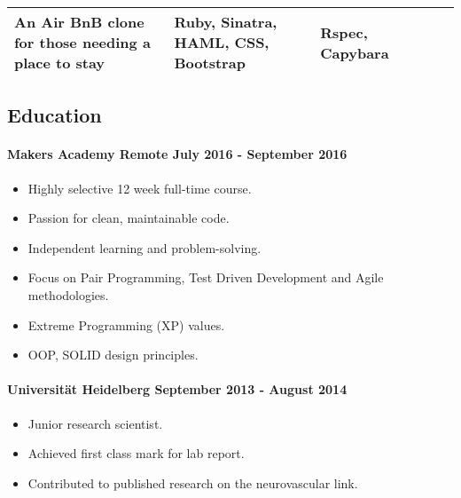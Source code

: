 \documentclass[]{article}
\providecommand{\tightlist}{%
  \setlength{\itemsep}{0pt}\setlength{\parskip}{0pt}}
\let\oldparagraph\paragraph
\renewcommand{\paragraph}[1]{\oldparagraph{#1}\mbox{}}
\begin{document}
\begin{longtable}[]{@{}llllll@{}}
\begin{minipage}[t]{0.05\columnwidth}
An Air BnB clone for those needing a place to stay\strut
\end{minipage} & \begin{minipage}[t]{0.05\columnwidth}\raggedright\strut
Ruby, Sinatra, HAML, CSS, Bootstrap\strut
\end{minipage} & \begin{minipage}[t]{0.05\columnwidth}\raggedright\strut
Rspec, Capybara\strut
\end{minipage} & \begin{minipage}[t]{0.05\columnwidth}\raggedright\strut
\strut
\end{minipage}\tabularnewline
\bottomrule
\end{longtable}

\subsection{Education}\label{education}

\paragraph{Makers Academy Remote \textbar{} July 2016 - September
2016}\label{makers-academy-remote-july-2016---september-2016}

\begin{itemize}
\tightlist
\item
  Highly selective 12 week full-time course.
\item
  Passion for clean, maintainable code.
\item
  Independent learning and problem-solving.
\item
  Focus on Pair Programming, Test Driven Development and Agile
  methodologies.
\item
  Extreme Programming (XP) values.
\item
  OOP, SOLID design principles.
\end{itemize}

\paragraph{Universität Heidelberg \textbar{} September 2013 - August
2014}\label{universituxe4t-heidelberg-september-2013---august-2014}

\begin{itemize}
\tightlist
\item
  Junior research scientist.
\item
  Achieved first class mark for lab report.
\item
  Contributed to published research on the neurovascular link.
\end{itemize}
\end{document}
